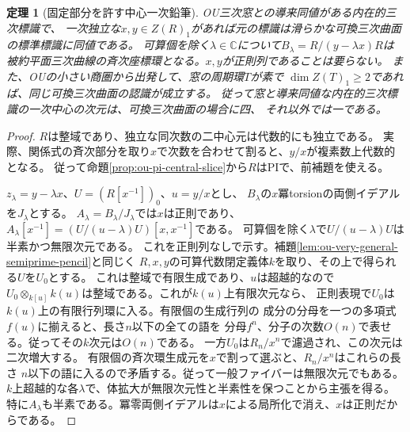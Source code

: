 \documentclass[11pt,a4paper]{ltjsarticle}
\newtheorem{theorem}{定理}[section]
\theoremstyle{definition}
\begin{document}
\begin{theorem}[固定部分を許す中心一次鉛筆]
\label{thm:ou-arbitrary-central-pencil}
OU三次窓との導来同値がある内在的三次標識で、
一次独立な$x,y\in Z(R)_1$があれば元の標識は滑らかな可換三次曲面の標準標識に同値である。
可算個を除く$\lambda\in\mathbb C$について$B_\lambda=R/(y-\lambda x)R$は
被約平面三次曲線の斉次座標環となる。$x,y$が正則列であることは要らない。
また、OUの小さい商圏から出発して、窓の周期環$T$が素で
$\dim Z(T)_1\ge2$であれば、同じ可換三次曲面の認識が成立する。
従って窓と導来同値な内在的三次標識の一次中心の次元は、可換三次曲面の場合に四、
それ以外では一である。
\end{theorem}
\begin{proof}
$R$は整域であり、独立な同次数の二中心元は代数的にも独立である。
実際、関係式の斉次部分を取り$x$で次数を合わせて割ると、$y/x$が複素数上代数的となる。
従って命題\ref{prop:ou-pi-central-slice}から$R$はPIで、前補題を使える。

$z_\lambda=y-\lambda x$、$U=(R[x^{-1}])_0$、$u=y/x$とし、
$B_\lambda$の$x$冪torsionの両側イデアルを$J_\lambda$とする。
$A_\lambda=B_\lambda/J_\lambda$では$x$は正則であり、
$A_\lambda[x^{-1}]=(U/(u-\lambda)U)[x,x^{-1}]$である。
可算個を除く$\lambda$で$U/(u-\lambda)U$は半素かつ無限次元である。
これを正則列なしで示す。補題\ref{lem:ou-very-general-semiprime-pencil}と同じく
$R,x,y$の可算代数閉定義体$k$を取り、その上で得られる$U$を$U_0$とする。
これは整域で有限生成であり、$u$は超越的なので
$U_0\otimes_{k[u]}k(u)$は整域である。これが$k(u)$上有限次元なら、
正則表現で$U_0$は$k(u)$上の有限行列環に入る。有限個の生成行列の
成分の分母を一つの多項式$f(u)$に揃えると、長さ$n$以下の全ての語を
分母$f^n$、分子の次数$O(n)$で表せる。従ってその$k$次元は$O(n)$である。
一方$U_0$は$R_n/x^n$で濾過され、この次元は二次増大する。
有限個の斉次環生成元を$x$で割って選ぶと、$R_n/x^n$はこれらの長さ
$n$以下の語に入るので矛盾する。従って一般ファイバーは無限次元でもある。
$k$上超越的な各$\lambda$で、体拡大が無限次元性と半素性を保つことから主張を得る。
特に$A_\lambda$も半素である。冪零両側イデアルは$x$による局所化で消え、$x$は正則だからである。


\end{proof}
\end{document}

